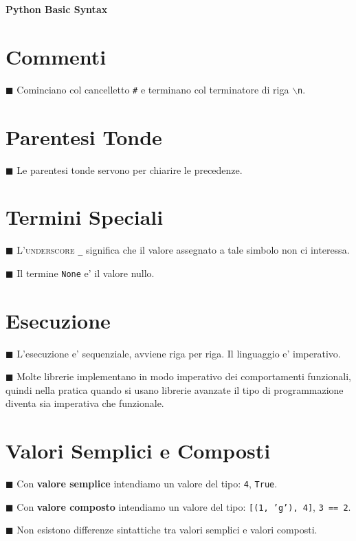 \documentclass[a4paper,12pt,fleqn,leqno,twoside]{article}
\renewcommand{\b}{\textbf} %
\newcommand{\tw}{\texttt} %
\renewcommand{\sc}{\textsc} %
\newcommand{\bbox}{{\scriptsize $\blacksquare$}} %
\newcommand{\skipline}{\vspace{\baselineskip}} %
\newcommand{\bs}{$\backslash$} %
\newcommand{\bitem}[1]{\bbox \; #1\par \skipline}
\begin{document}
{\center\LARGE\b{Python Basic Syntax}\par}

\skipline

\tableofcontents

\clearpage

\section{Commenti}

\bitem{Cominciano col cancelletto \tw{\#} e terminano col terminatore di riga \tw{\bs n}.}

\section{Parentesi Tonde}

\bitem{Le parentesi tonde servono per chiarire le precedenze.}

\section{Termini Speciali}

\bitem{L'\sc{underscore} \tw{\_} significa che il valore assegnato a tale simbolo non ci interessa.}

\bitem{Il termine \tw{None} e' il valore nullo.}

\section{Esecuzione}

\bitem{L'esecuzione e' sequenziale, avviene riga per riga. Il linguaggio e' imperativo.}

\bitem{Molte librerie implementano in modo imperativo dei comportamenti funzionali, quindi nella pratica quando si usano librerie avanzate il tipo di programmazione diventa sia imperativa che funzionale.}

\section{Valori Semplici e Composti}

\bitem{Con \b{valore semplice} intendiamo un valore del tipo: \tw{4}, \tw{True}.}

\bitem{Con \b{valore composto} intendiamo un valore del tipo: \tw{[(1, 'g'), 4]}, \tw{3 == 2}.}

\bitem{Non esistono differenze sintattiche tra valori semplici e valori composti.}
\end{document}
